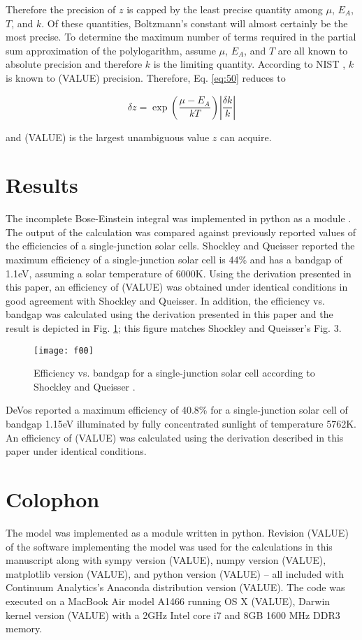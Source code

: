 \documentclass[letterpaper,12pt]{article}
\begin{document}
\noindent Therefore the precision of $z$ is capped by the least precise quantity among $\mu$, $E_{A}$, $T$, and $k$. Of these quantities, Boltzmann's constant will almost certainly be the most precise. To determine the maximum number of terms required in the partial sum approximation of the polylogarithm, assume $\mu$, $E_{A}$, and $T$ are all known to absolute precision and therefore $k$ is the limiting quantity. According to NIST \cite{}, $k$ is known to (VALUE) precision. Therefore, Eq. \ref{eq:50} reduces to

\begin{equation} \label{eq:51}
\delta z = \exp \left( \frac{\mu - E_{A}}{kT} \right) \left| \frac{\delta k}{k} \right|
\end{equation}

\noindent and (VALUE) is the largest unambiguous value $z$ can acquire.


\section{Results}
The incomplete Bose-Einstein integral was implemented in python as a module \cite{}. The output of the calculation was compared against previously reported values of the efficiencies of a single-junction solar cells. Shockley and Queisser \cite{10.1063/1.1736034} reported the maximum efficiency of a single-junction solar cell is 44\% and has a bandgap of 1.1eV, assuming a solar temperature of 6000K. Using the derivation presented in this paper, an efficiency of (VALUE) was obtained under identical conditions in good agreement with Shockley and Queisser. In addition, the efficiency vs. bandgap was calculated using the derivation presented in this paper and the result is depicted in Fig. \ref{fig:00}; this figure matches Shockley and Queisser's Fig. 3.


\begin{figure}
\texttt{[image: f00]}
\caption{Efficiency vs. bandgap for a single-junction solar cell according to Shockley and Queisser \cite{10.1063/1.1736034}.}
\label{fig:00}
\end{figure}


DeVos \cite{9780198513926} reported a maximum efficiency of 40.8\% for a single-junction solar cell of bandgap 1.15eV illuminated by fully concentrated sunlight of temperature 5762K. An efficiency of (VALUE) was calculated using the derivation described in this paper under identical conditions.


\section{Colophon}
The model was implemented as a module written in python. Revision (VALUE) \cite{} of the software implementing the model was used for the calculations in this manuscript along with sympy version (VALUE), numpy version (VALUE), matplotlib version (VALUE), and python version (VALUE) -- all included with Continuum Analytics's Anaconda distribution version (VALUE).  The code was executed on a MacBook Air model A1466 running OS X (VALUE), Darwin kernel version (VALUE) with a 2GHz Intel core i7 and 8GB 1600 MHz DDR3 memory.
\end{document}
